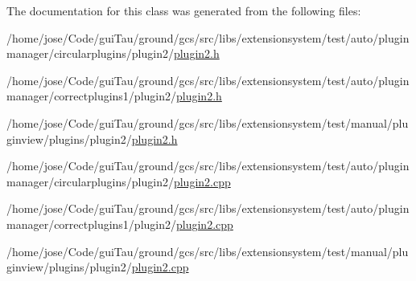 The documentation for this class was generated from the following files\-:\begin{DoxyCompactItemize}
\item 
/home/jose/\-Code/gui\-Tau/ground/gcs/src/libs/extensionsystem/test/auto/pluginmanager/circularplugins/plugin2/\hyperlink{auto_2pluginmanager_2circularplugins_2plugin2_2plugin2_8h}{plugin2.\-h}\item 
/home/jose/\-Code/gui\-Tau/ground/gcs/src/libs/extensionsystem/test/auto/pluginmanager/correctplugins1/plugin2/\hyperlink{auto_2pluginmanager_2correctplugins1_2plugin2_2plugin2_8h}{plugin2.\-h}\item 
/home/jose/\-Code/gui\-Tau/ground/gcs/src/libs/extensionsystem/test/manual/pluginview/plugins/plugin2/\hyperlink{manual_2pluginview_2plugins_2plugin2_2plugin2_8h}{plugin2.\-h}\item 
/home/jose/\-Code/gui\-Tau/ground/gcs/src/libs/extensionsystem/test/auto/pluginmanager/circularplugins/plugin2/\hyperlink{auto_2pluginmanager_2circularplugins_2plugin2_2plugin2_8cpp}{plugin2.\-cpp}\item 
/home/jose/\-Code/gui\-Tau/ground/gcs/src/libs/extensionsystem/test/auto/pluginmanager/correctplugins1/plugin2/\hyperlink{auto_2pluginmanager_2correctplugins1_2plugin2_2plugin2_8cpp}{plugin2.\-cpp}\item 
/home/jose/\-Code/gui\-Tau/ground/gcs/src/libs/extensionsystem/test/manual/pluginview/plugins/plugin2/\hyperlink{manual_2pluginview_2plugins_2plugin2_2plugin2_8cpp}{plugin2.\-cpp}\end{DoxyCompactItemize}
